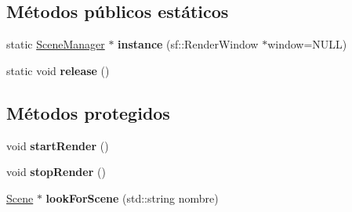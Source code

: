 \subsection*{Métodos públicos estáticos}
\begin{DoxyCompactItemize}
\item 
\hypertarget{class_e_s_e_1_1_scene_manager_aaaa89971bb80990b3a81373288611707}{static \hyperlink{class_e_s_e_1_1_scene_manager}{Scene\-Manager} $\ast$ {\bfseries instance} (sf\-::\-Render\-Window $\ast$window=N\-U\-L\-L)}\label{class_e_s_e_1_1_scene_manager_aaaa89971bb80990b3a81373288611707}

\item 
\hypertarget{class_e_s_e_1_1_scene_manager_a5b0684cc0813e996c76b99bee1bb2afc}{static void {\bfseries release} ()}\label{class_e_s_e_1_1_scene_manager_a5b0684cc0813e996c76b99bee1bb2afc}

\end{DoxyCompactItemize}
\subsection*{Métodos protegidos}
\begin{DoxyCompactItemize}
\item 
\hypertarget{class_e_s_e_1_1_scene_manager_a6d218fbaf082f65d8ed1a0160e39b0e2}{void {\bfseries start\-Render} ()}\label{class_e_s_e_1_1_scene_manager_a6d218fbaf082f65d8ed1a0160e39b0e2}

\item 
\hypertarget{class_e_s_e_1_1_scene_manager_aad06a2b77464393deb4aa5fb2814529d}{void {\bfseries stop\-Render} ()}\label{class_e_s_e_1_1_scene_manager_aad06a2b77464393deb4aa5fb2814529d}

\item 
\hypertarget{class_e_s_e_1_1_scene_manager_a567e482476f30f59ddd1558985cea345}{\hyperlink{class_e_s_e_1_1_scene}{Scene} $\ast$ {\bfseries look\-For\-Scene} (std\-::string nombre)}\label{class_e_s_e_1_1_scene_manager_a567e482476f30f59ddd1558985cea345}

\end{DoxyCompactItemize}
